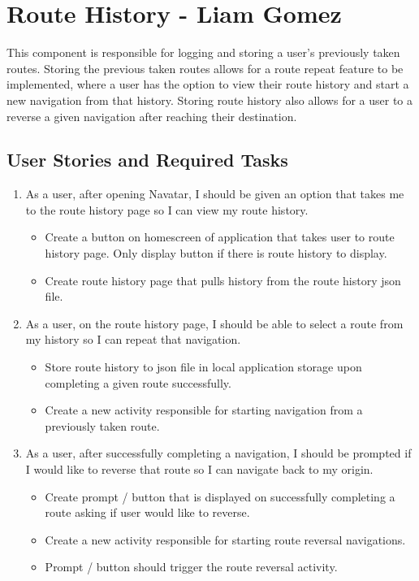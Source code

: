 \documentclass{scrreprt}
\begin{document}
\section{Route History - Liam Gomez}
This component is responsible for logging and storing a user’s previously taken routes. Storing the previous taken routes allows for a route repeat feature to be implemented, where a user has the option to view their route history and start a new navigation from that history. Storing route history also allows for a user to a reverse a given navigation after reaching their destination.

\subsection{User Stories and Required Tasks}
\begin{enumerate}
	\item As a user, after opening Navatar, I should be given an option that takes me to the route history page so I can view my route history.
	
		\begin{itemize}
			\item Create a button on homescreen of application that takes user to route history page. Only display button if there is route history to display.
			\item Create route history page that pulls history from the route history json file.
		\end{itemize}
	
	\item As a user, on the route history page, I should be able to select a route from my history so I can repeat that navigation.
	
		\begin{itemize}
			\item Store route history to json file in local application storage upon completing a given route successfully.
			\item Create a new activity responsible for starting navigation from a previously taken route.
		\end{itemize}
\pagebreak
	\item As a user, after successfully completing a navigation, I should be prompted if I would like to reverse that route so I can navigate back to my origin.
	
		\begin{itemize}
			\item Create prompt / button that is displayed on successfully completing a route asking if user would like to reverse.
			\item Create a new activity responsible for starting route reversal navigations.
			\item Prompt / button should trigger the route reversal activity.
		\end{itemize}


\end{enumerate}
\end{document}
